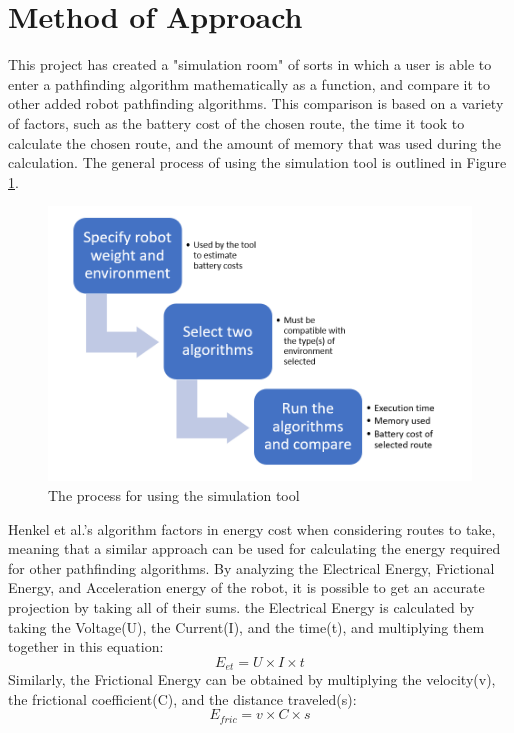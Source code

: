 \section{Method of Approach}
This project has created a "simulation room" of sorts in which a user is able to enter a pathfinding algorithm mathematically as a function, and compare it to other added robot pathfinding algorithms. This comparison is based on a variety of factors, such as the battery cost of the chosen route, the time it took to calculate the chosen route, and the amount of memory that was used during the calculation. The general process of using the simulation tool is outlined in Figure \ref{fig:Usage}.
\begin{figure}[H]
    \centering
    \includegraphics[width=5in]{../images/ProposalMethodFlowchart}
    \caption{The process for using the simulation tool}
    \label{fig:Usage}
\end{figure}
\par
Henkel et al.'s algorithm factors in energy cost when considering routes to take\cite{henkel2016energy}, meaning that a similar approach can be used for calculating the energy required for other pathfinding algorithms. By analyzing the Electrical Energy, Frictional Energy, and Acceleration energy of the robot, it is possible to get an accurate projection by taking all of their sums. the Electrical Energy is calculated by taking the Voltage(U), the Current(I), and the time(t), and multiplying them together in this equation:\begin{equation}
    E_{et} = U\times I\times t
\end{equation}
Similarly, the Frictional Energy can be obtained by multiplying the velocity(v), the frictional coefficient(C), and the distance traveled(s):\begin{equation}
    E_{fric} = v \times C \times s
\end{equation}
